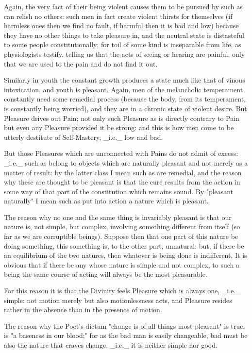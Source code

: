 Again, the very fact of their being violent causes them to be pursued by
such as can relish no others: such men in fact create violent thirsts
for themselves (if harmless ones then we find no fault, if harmful then
it is bad and low) because they have no other things to take
pleasure in, and the neutral state is distasteful to some people
constitutionally; for toil of some kind is inseparable from life, as
physiologists testify, telling us that the acts of seeing or hearing are
painful, only that we are used to the pain and do not find it out.

Similarly in youth the constant growth produces a state much like
that of vinous intoxication, and youth is pleasant. Again, men of the
melancholic temperament constantly need some remedial process (because
the body, from its temperament, is constantly being worried), and they
are in a chronic state of violent desire. But Pleasure drives out Pain;
not only such Pleasure as is directly contrary to Pain but even any
Pleasure provided it be strong: and this is how men come to be utterly
destitute of Self-Mastery, _i.e._ low and bad.

But those Pleasures which are unconnected with Pains do not admit of
excess: _i.e._ such as belong to objects which are naturally pleasant
and not merely as a matter of result: by the latter class I mean such
as are remedial, and the reason why these are thought to be pleasant is
that the cure results from the action in some way of that part of the
constitution which remains sound. By "pleasant naturally" I mean such as
put into action a nature which is pleasant.

The reason why no one and the same thing is invariably pleasant is that
our nature is, not simple, but complex, involving something different
from itself (so far as we are corruptible beings). Suppose then that one
part of this nature be doing something, this something is, to the other
part, unnatural: but, if there be an equilibrium of the two natures,
then whatever is being done is indifferent. It is obvious that if there
be any whose nature is simple and not complex, to such a being the same
course of acting will always be the most pleasurable.

For this reason it is that the Divinity feels Pleasure which is always
one, _i.e._ simple: not motion merely but also motionlessness acts, and
Pleasure resides rather in the absence than in the presence of motion.

The reason why the Poet's dictum "change is of all things most pleasant"
is true, is "a baseness in our blood;" for as the bad man is easily
changeable, bad must be also the nature that craves change, _i.e._ it is
neither simple nor good.

